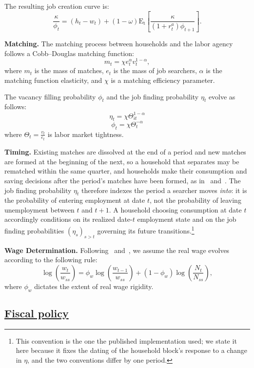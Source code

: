 \documentclass[\latexroot/\projectname]{subfiles}
\begin{document}
The resulting job creation curve is:
\[
  \frac{\kappa}{\phi_{t}}  = (h_{t} - w_{t})+  (1-\omega)\mathrm{E_{t}}\left[   \frac{\kappa}{(1+r^{a}_{t}) \phi_{t+1}} \right].
\]

\textbf{Matching.} The matching process between households and the labor agency follows a Cobb--Douglas matching function:
\[
  m_{t} = \chi e_{t}^{\alpha} v_{t}^{1-\alpha},
\]
where $m_{t}$ is the mass of matches, $e_{t}$ is the mass of job searchers, $\alpha$ is the matching function elasticity, and $\chi$ is a matching efficiency parameter.

The vacancy filling probability \( \phi_t \) and the job finding probability \( \eta_t \) evolve as follows:
\[
  \eta_{t} = \chi \Theta_{it}^{1-\alpha}
\]
\[
  \phi_{t} = \chi \Theta_{t}^{-\alpha}
\]
where $\Theta_{t} = \frac{v_{t}}{e_{t}}$ is labor market tightness.

\textbf{Timing.} Existing matches are dissolved at the end of a period and new matches are formed at
the beginning of the next, so a household that separates may be rematched within the same quarter, and
households make their consumption and saving decisions after the period's matches have been formed, as
in~\cite{Ravn2017,Ravn2021} and~\cite{Du2025}. The job finding probability $\eta_{t}$ therefore indexes
the period a searcher moves \emph{into}: it is the probability of entering employment at date $t$, not
the probability of leaving unemployment between $t$ and $t+1$. A household choosing consumption at
date $t$ accordingly conditions on its realized date-$t$ employment state and on the job finding
probabilities ${\left(\eta_{s}\right)}_{s>t}$ governing its future transitions.\footnote{This
convention is the one the published implementation used; we state it here because it fixes the dating
of the household block's response to a change in $\eta$, and the two conventions differ by one period.}

\textbf{Wage Determination.} Following~\cite{Gornemann2021} and~\cite{Blanchard2010}, we assume the real wage evolves according to the following rule:
\[
  \log\left(\frac{w_{t}}{w_{ss}}\right)  = \phi_w \log\left( \frac{ w_{t-1}}{ w_{ss}} \right) +   (1 - \phi_w) \log\left( \frac{N_{t}}{N_{ss}}\right),
\]
where $\phi_w$ dictates the extent of real wage rigidity.

\subsection{\href{\WebBase\#sec:hank-fiscal-policy}{Fiscal policy}}\whenintegrated{\label{sec:hank-fiscal-policy}}
\end{document}
